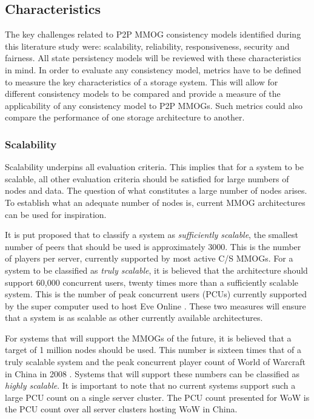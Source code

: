 \documentclass[10pt,a4paper,journal,cspaper,compsoc]{IEEEtran}
\begin{document}
\subsection{Characteristics}
\label{key_challenges_cm}

The key challenges related to P2P MMOG consistency models identified during this literature study were: scalability, reliability, responsiveness,
security and fairness. All state persistency models will be reviewed with these characteristics in mind. In order to evaluate any consistency model,
metrics have to be defined to measure the key characteristics of a storage system. This will allow for different consistency models to be compared
and provide a measure of the applicability of any consistency model to P2P MMOGs. Such metrics could also compare the performance of one storage
architecture to another.

\subsubsection{Scalability}
Scalability underpins all evaluation criteria. This implies that for a system to be scalable, all other evaluation criteria should be satisfied for
large numbers of nodes and data. The question of what constitutes a large number of nodes arises. To establish what an adequate number of nodes is,
current MMOG architectures can be used for inspiration.

It is put proposed that to classify a system as \emph{sufficiently scalable}, the smallest number of peers that should be used is approximately 3000.
This is the number of players per server, currently supported by most active C/S MMOGs. For a system to be classified as \emph{truly scalable}, it is
believed that the architecture should support 60,000 concurrent users, twenty times more than a sufficiently scalable system. This is the number of
peak concurrent users (PCUs) currently supported by the super computer used to host Eve Online \cite{eve_pcu}. These two measures will ensure that a
system is as scalable as other currently available architectures.

For systems that will support the MMOGs of the future, it is believed that a target of 1 million nodes should be used. This number is sixteen times
that of a truly scalable system and the peak concurrent player count of World of Warcraft in China in 2008 \cite{WoW_china_pcu}. Systems that will
support these numbers can be classified as \emph{highly scalable}. It is important to note that no current systems support such a large PCU count on
a single server cluster. The PCU count presented for WoW is the PCU count over all server clusters hosting WoW in China.
\end{document}
